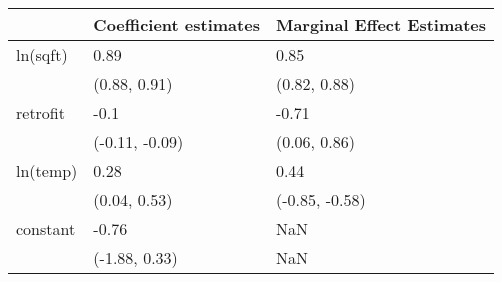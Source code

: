 \begin{tabular}{lll}
\toprule
{} & Coefficient estimates & Marginal Effect Estimates \\
\midrule
ln(sqft) &                  0.89 &                      0.85 \\
         &          (0.88, 0.91) &              (0.82, 0.88) \\
retrofit &                  -0.1 &                     -0.71 \\
         &        (-0.11, -0.09) &              (0.06, 0.86) \\
ln(temp) &                  0.28 &                      0.44 \\
         &          (0.04, 0.53) &            (-0.85, -0.58) \\
constant &                 -0.76 &                       NaN \\
         &         (-1.88, 0.33) &                       NaN \\
\bottomrule
\end{tabular}
